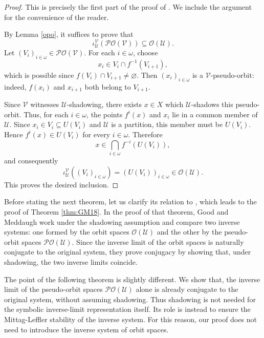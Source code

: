 \documentclass[12pt]{amsart}
\theoremstyle{definition}
\numberwithin{equation}{section}
\theoremstyle{remark}
\begin{document}
\begin{proof}
This is precisely the first part of the proof of \cite[Lemma 15]{GM}. We
include the argument for the convenience of the reader.

By Lemma \ref{opo}, it suffices to prove that
\[
    \iota_{\mathcal U}^{\mathcal V}(\mathcal{PO}(\mathcal V))
    \subseteq \mathcal O(\mathcal U).
\]
Let $(V_i)_{i\in\omega}\in\mathcal{PO}(\mathcal V)$. For each $i\in\omega$,
choose
\[
    x_i\in V_i\cap f^{-1}(V_{i+1}),
\]
which is possible since $f(V_i)\cap V_{i+1}\neq\varnothing$. Then
$(x_i)_{i\in\omega}$ is a $\mathcal V$-pseudo-orbit: indeed,
$f(x_i)$ and $x_{i+1}$ both belong to $V_{i+1}$.

Since $\mathcal V$ witnesses $\mathcal U$-shadowing, there exists $x\in X$
which $\mathcal U$-shadows this pseudo-orbit. Thus, for each $i\in\omega$,
the points $f^i(x)$ and $x_i$ lie in a common member of $\mathcal U$. Since
$x_i\in V_i\subseteq U(V_i)$ and $\mathcal U$ is a partition, this member must
be $U(V_i)$. Hence $f^i(x)\in U(V_i)$ for every $i\in\omega$. Therefore
\[
    x\in \bigcap_{i\in\omega} f^{-i}(U(V_i)),
\]
and consequently
\[
    \iota_{\mathcal U}^{\mathcal V}((V_i)_{i\in\omega})
    =
    (U(V_i))_{i\in\omega}
    \in \mathcal O(\mathcal U).
\]
This proves the desired inclusion.
\end{proof}





Before stating the next theorem, let us clarify its relation to
\cite[Theorem 16]{GM}, which leads to the proof of Theorem \ref{thm:GM18}. In the proof of that theorem, Good and Meddaugh work
under the shadowing assumption and compare two inverse systems: one formed by
the orbit spaces $\mathcal O(\mathcal U)$ and the other by the pseudo-orbit
spaces $\mathcal{PO}(\mathcal U)$. Since the inverse limit of the orbit spaces
is naturally conjugate to the original system, they prove conjugacy by showing
that, under shadowing, the two inverse limits coincide.

The point of the following theorem is slightly different. We show that, the inverse limit of the pseudo-orbit spaces
$\mathcal{PO}(\mathcal U)$ alone is already conjugate to the original system,
without assuming shadowing. Thus shadowing is not needed for the symbolic
inverse-limit representation itself. Its role is instead to ensure the
Mittag-Leffler stability of the inverse system. For this reason, our proof does
not need to introduce the inverse system of orbit spaces.
\end{document}
